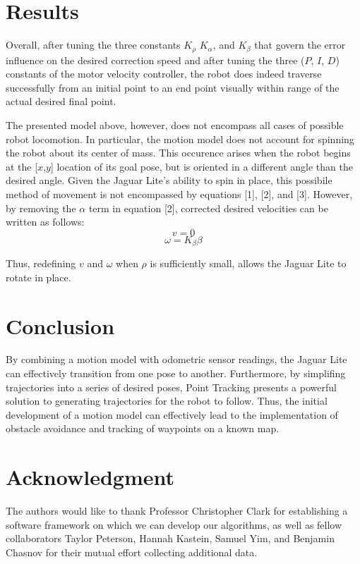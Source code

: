 \documentclass[conference]{IEEEtran}
\begin{document}
\section{Results}

Overall, after tuning the three constants $K_{\rho}$ $K_{\alpha}$, and $K_{\beta}$ 
that govern the error influence on the desired correction speed and after tuning
the three ($P$, $I$, $D$) constants of the motor velocity controller, the robot does indeed 
traverse successfully from an initial point to an end point visually within range of the 
actual desired final point.  

The presented model above, however, does not encompass all cases of possible robot 
locomotion.  In particular, the motion model does not account for spinning the robot about
its center of mass.  This occurence arises when the robot begins at the [$x$,$y$] location 
of its goal pose, but is oriented in a different angle than the desired angle.  Given the 
Jaguar Lite's ability to spin in place, this possibile method of movement is not encompassed by equations
[1], [2], and [3].  
However, by removing the $\alpha$ term in equation [2], corrected desired velocities 
can be written as follows:
\begin{equation} 
v = 0
\end{equation}
\begin{equation}
\omega = K_{\beta} \beta 
\end{equation}

Thus, redefining $v$ and $\omega$ when $\rho$ is sufficiently small, allows the Jaguar Lite to rotate 
in place.


\section{Conclusion}
By combining a motion model with odometric sensor readings, the Jaguar 
Lite can effectively transition from one pose to another.
Furthermore, by simplifing trajectories into a series of desired poses,
Point Tracking presents a powerful solution to generating trajectories 
for the robot to follow.  Thus, the initial development of a motion model
can effectively lead to the implementation of obstacle avoidance and 
tracking of waypoints on a known map.


\section*{Acknowledgment}


The authors would like to thank Professor Christopher Clark for 
establishing a software framework on which we can 
develop our algorithms, as well as fellow collaborators Taylor Peterson, Hannah
Kastein, Samuel Yim, and Benjamin Chasnov for their mutual effort collecting
additional data.
\end{document}
